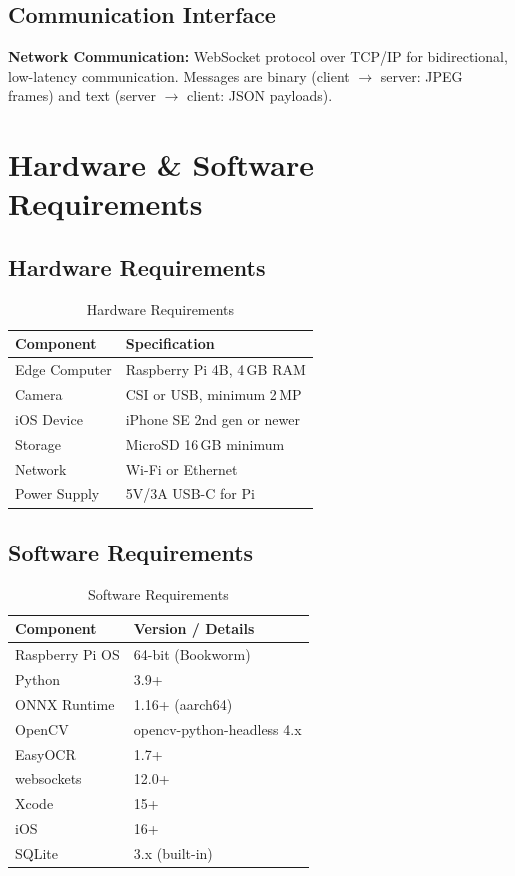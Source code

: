 \documentclass[11pt]{report}
\begin{document}
\subsection{Communication Interface}
\textbf{Network Communication:} WebSocket protocol over TCP/IP for bidirectional, low-latency communication. Messages are binary (client $\to$ server: JPEG frames) and text (server $\to$ client: JSON payloads).

\section{Hardware \& Software Requirements}
\subsection{Hardware Requirements}
\begin{table}[H]
\centering
\caption{Hardware Requirements}
\renewcommand{\arraystretch}{1.3}
\begin{tabular}{|l|l|}
\hline
\textbf{Component} & \textbf{Specification} \\
\hline
Edge Computer & Raspberry Pi 4B, 4\,GB RAM \\
\hline
Camera & CSI or USB, minimum 2\,MP \\
\hline
iOS Device & iPhone SE 2nd gen or newer \\
\hline
Storage & MicroSD 16\,GB minimum \\
\hline
Network & Wi-Fi or Ethernet \\
\hline
Power Supply & 5V/3A USB-C for Pi \\
\hline
\end{tabular}
\end{table}

\subsection{Software Requirements}
\begin{table}[H]
\centering
\caption{Software Requirements}
\renewcommand{\arraystretch}{1.3}
\begin{tabular}{|l|l|}
\hline
\textbf{Component} & \textbf{Version / Details} \\
\hline
Raspberry Pi OS & 64-bit (Bookworm) \\
\hline
Python & 3.9+ \\
\hline
ONNX Runtime & 1.16+ (aarch64) \\
\hline
OpenCV & opencv-python-headless 4.x \\
\hline
EasyOCR & 1.7+ \\
\hline
websockets & 12.0+ \\
\hline
Xcode & 15+ \\
\hline
iOS & 16+ \\
\hline
SQLite & 3.x (built-in) \\
\hline
\end{tabular}
\end{table}
\end{document}
